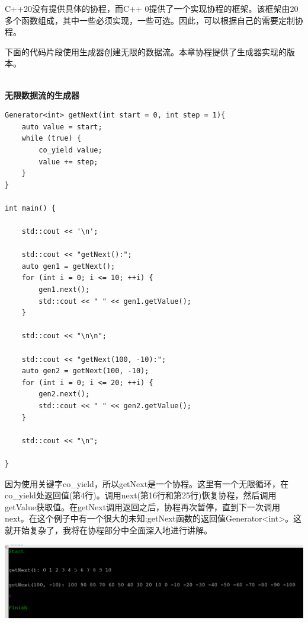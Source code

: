 C++20没有提供具体的协程，而C++ 0提供了一个实现协程的框架。该框架由20多个函数组成，其中一些必须实现，一些可选。因此，可以根据自己的需要定制协程。

下面的代码片段使用生成器创建无限的数据流。本章协程提供了生成器实现的版本。

\hspace*{\fill} \\ %
\noindent
\textbf{无限数据流的生成器}
\begin{lstlisting}[style=styleCXX]
Generator<int> getNext(int start = 0, int step = 1){
	auto value = start;
	while (true) {
		co_yield value;
		value += step;
	}
}

int main() {
	
	std::cout << '\n';
	
	std::cout << "getNext():";
	auto gen1 = getNext();
	for (int i = 0; i <= 10; ++i) {
		gen1.next();
		std::cout << " " << gen1.getValue();
	}
	
	std::cout << "\n\n";
	
	std::cout << "getNext(100, -10):";
	auto gen2 = getNext(100, -10);
	for (int i = 0; i <= 20; ++i) {
		gen2.next();
		std::cout << " " << gen2.getValue();
	}
	
	std::cout << "\n";

}
\end{lstlisting}

因为使用关键字co\_yield，所以getNext是一个协程。这里有一个无限循环，在co\_yield处返回值(第4行)。调用next(第16行和第25行)恢复协程，然后调用getValue获取值。在getNext调用返回之后，协程再次暂停，直到下一次调用next。在这个例子中有一个很大的未知:getNext函数的返回值Generator<int>。这就开始复杂了，我将在协程部分中全面深入地进行讲解。

\begin{center}
\includegraphics[width=1.0\textwidth]{content/2/chapter3/images/3.png}\\
\end{center}















